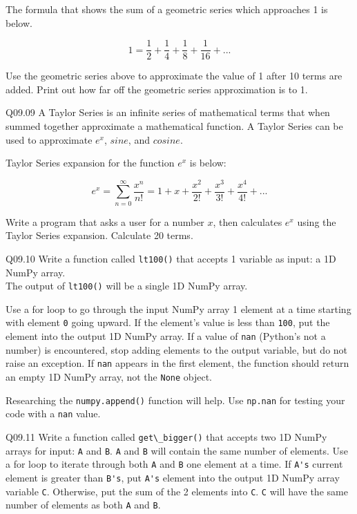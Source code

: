 \documentclass{book}
\newenvironment{problems}{}{}  %
\newcommand{\passthrough}[1]{#1}
\begin{document}
\begin{problems}
The formula that shows the sum of a geometric series which approaches 1
is below.

\[ 1 = \frac{1}{2} + \frac{1}{4} + \frac{1}{8} + \frac{1}{16} + ... \]

Use the geometric series above to approximate the value of 1 after 10
terms are added. Print out how far off the geometric series
approximation is to 1.

Q09.09 A Taylor Series is an infinite series of mathematical terms that
when summed together approximate a mathematical function. A Taylor
Series can be used to approximate \(e^x\), \(sine\), and \(cosine\).

Taylor Series expansion for the function \(e^x\) is below:

\[  {e^x} = \sum\limits_{n = 0}^\infty  {\frac{{{x^n}}}{{n!}}}  = 1 + x + \frac{{{x^2}}}{{2!}} + \frac{{{x^3}}}{{3!}} + \frac{{{x^4}}}{{4!}} + ... \]

Write a program that asks a user for a number \(x\), then calculates
\(e^x\) using the Taylor Series expansion. Calculate 20 terms.

Q09.10 Write a function called \passthrough{\lstinline!lt100()!} that
accepts 1 variable as input: a 1D NumPy array.\\
The output of \passthrough{\lstinline!lt100()!} will be a single 1D
NumPy array.

Use a for loop to go through the input NumPy array 1 element at a time
starting with element \passthrough{\lstinline!0!} going upward. If the
element's value is less than \passthrough{\lstinline!100!}, put the
element into the output 1D NumPy array. If a value of
\passthrough{\lstinline!nan!} (Python's not a number) is encountered,
stop adding elements to the output variable, but do not raise an
exception. If \passthrough{\lstinline!nan!} appears in the first
element, the function should return an empty 1D NumPy array, not the
\passthrough{\lstinline!None!} object.

Researching the \passthrough{\lstinline!numpy.append()!} function will
help. Use \passthrough{\lstinline!np.nan!} for testing your code with a
\passthrough{\lstinline!nan!} value.

Q09.11 Write a function called \passthrough{\lstinline!get\_bigger()!}
that accepts two 1D NumPy arrays for input: \passthrough{\lstinline!A!}
and \passthrough{\lstinline!B!}. \passthrough{\lstinline!A!} and
\passthrough{\lstinline!B!} will contain the same number of elements.
Use a for loop to iterate through both \passthrough{\lstinline!A!} and
\passthrough{\lstinline!B!} one element at a time. If
\passthrough{\lstinline!A's!} current element is greater than
\passthrough{\lstinline!B's!}, put \passthrough{\lstinline!A's!} element
into the output 1D NumPy array variable \passthrough{\lstinline!C!}.
Otherwise, put the sum of the 2 elements into
\passthrough{\lstinline!C!}. \passthrough{\lstinline!C!} will have the
same number of elements as both \passthrough{\lstinline!A!} and
\passthrough{\lstinline!B!}.


\end{problems}
\end{document}
